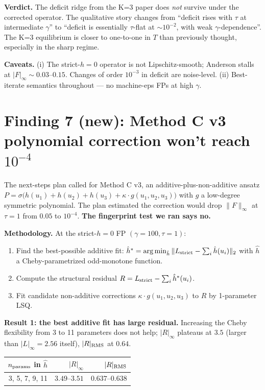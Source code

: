 \documentclass[11pt]{article}
\begin{document}
\textbf{Verdict.} The deficit ridge from the K=3 paper does \emph{not}
survive under the corrected operator. The qualitative story changes
from ``deficit rises with $\tau$ at intermediate $\gamma$'' to
``deficit is essentially $\tau$-flat at $\sim 10^{-2}$, with weak
$\gamma$-dependence''. The K=3 equilibrium is closer to one-to-one in
$T$ than previously thought, especially in the sharp regime.

\textbf{Caveats.} (i) The strict-$h{=}0$ operator is not Lipschitz-smooth;
Anderson stalls at $|F|_\infty \sim 0.03$--$0.15$. Changes of order
$10^{-3}$ in deficit are noise-level. (ii) Best-iterate semantics
throughout --- no machine-eps FPs at high $\gamma$.

\section{Finding 7 (new): Method C v3 polynomial correction won't reach $10^{-4}$}

The next-steps plan called for Method C v3, an additive-plus-non-additive ansatz
$P = \sigma\bigl(h(u_1) + h(u_2) + h(u_3) + \kappa \cdot g(u_1, u_2, u_3)\bigr)$
with $g$ a low-degree symmetric polynomial. The plan estimated the
correction would drop $\|F\|_\infty$ at $\tau{=}1$ from $0.05$ to $10^{-4}$.
\textbf{The fingerprint test we ran says no.}

\textbf{Methodology.} At the strict-$h{=}0$ FP $(\gamma{=}100, \tau{=}1)$:
\begin{enumerate}\itemsep1pt
  \item Find the best-possible additive fit:
        $\hat h^* = \arg\min_{\hat h} \| L_{\rm strict} - \sum_i \hat h(u_i) \|_2$
        with $\hat h$ a Cheby-parametrized odd-monotone function.
  \item Compute the structural residual
        $R = L_{\rm strict} - \sum_i \hat h^*(u_i)$.
  \item Fit candidate non-additive corrections
        $\kappa \cdot g(u_1, u_2, u_3)$ to $R$ by 1-parameter LSQ.
\end{enumerate}

\textbf{Result 1: the best additive fit has large residual.} Increasing
the Cheby flexibility from 3 to 11 parameters does not help; $|R|_\infty$
plateaus at $3.5$ (larger than $|L|_\infty = 2.56$ itself), $|R|_{\rm RMS}$
at $0.64$.

\begin{center}\begin{tabular}{rrr}\toprule
$n_{\rm params}$ in $\hat h$ & $|R|_\infty$ & $|R|_{\rm RMS}$ \\
\midrule
3, 5, 7, 9, 11 & $3.49$--$3.51$ & $0.637$--$0.638$ \\
\bottomrule\end{tabular}\end{center}
\end{document}
